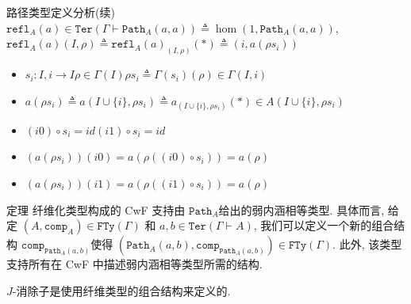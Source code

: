 \documentclass[aspectratio=169,xcolor=dvipsnames]{beamer}
\newcommand\FTy{\mathtt{FTy}}
\newcommand\comp{\mathtt{comp}}
\newcommand\Ter{\mathtt{Ter}}
\newcommand\Path{\mathtt{Path}}
\newcommand\refl{\mathtt{refl}}
\begin{document}
\begin{frame}{路径类型定义分析(续)}
  $\refl_{A}(a)\in\Ter(\Gamma\vdash \Path_{A}(a,a))\triangleq\hom(1,\Path_A(a,a))$, $\refl_A(a)(I,\rho)\triangleq\refl_{A}(a)_{(I,\rho)}(\ast)\triangleq(i,a(\rho s_i))$
  \begin{itemize}
    \item $s_i : I,i\to I$\quad $\rho\in\Gamma(I)$\quad $\rho s_i\triangleq \Gamma(s_i)(\rho)\in\Gamma(I,i)$
    \item $a(\rho s_i)\triangleq a(I\cup\{i\},\rho s_i)\triangleq a_{(I\cup\{i\},\rho s_i)}(\ast)\in A(I\cup\{i\},\rho s_i)$
    \item $(i0)\circ s_i = id$\quad $(i1)\circ s_i = id$
    \item $(a(\rho s_i))(i0) = a(\rho((i0)\circ s_i)) = a(\rho)$
    \item $(a(\rho s_i))(i1) = a(\rho((i1)\circ s_i)) = a(\rho)$
  \end{itemize}
\end{frame}

\begin{frame}{定理}
   纤维化类型构成的 CwF 支持由 $\Path_{A}$​ 给出的弱内涵相等类型. 具体而言, 给定 $(A,\comp_{A})\in\FTy(\Gamma)$ 和 $a,b\in\Ter(\Gamma\vdash A)$, 我们可以定义一个新的组合结构 $\comp_{\Path_{A}(a,b)}$​ 使得 $(\Path_{A}(a,b),\comp_{\Path_{A}(a,b)})\in\FTy(\Gamma)$. 此外, 该类型支持所有在 CwF 中描述弱内涵相等类型所需的结构.

   $J$-消除子是使用纤维类型的组合结构来定义的.
\end{frame}
\end{document}
